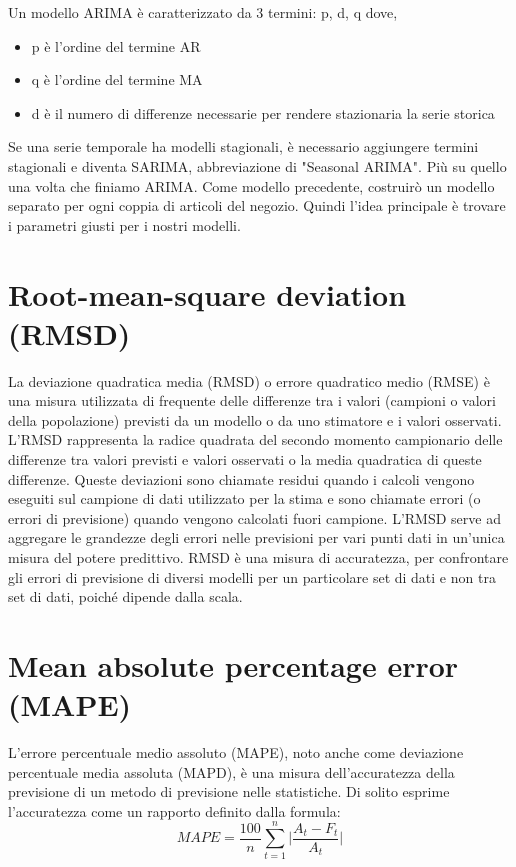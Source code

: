 \documentclass[12pt,a4paper]{report}
\begin{document}
\begin{appendices}
Un modello ARIMA è caratterizzato da 3 termini: p, d, q dove,
\begin{itemize}
    \item p è l'ordine del termine AR
    \item q è l'ordine del termine MA
    \item d è il numero di differenze necessarie per rendere stazionaria la serie storica
\end{itemize}

Se una serie temporale ha modelli stagionali, è necessario aggiungere termini stagionali e diventa SARIMA, abbreviazione di "Seasonal ARIMA". Più su quello una volta che finiamo ARIMA. Come modello precedente, costruirò un modello separato per ogni coppia di articoli del negozio. Quindi l'idea principale è trovare i parametri giusti per i nostri modelli.

\section{Root-mean-square deviation (RMSD)}
\label{appendix:RMSD}
La deviazione quadratica media (RMSD) o errore quadratico medio (RMSE) è una misura utilizzata di frequente delle differenze tra i valori (campioni o valori della popolazione) previsti da un modello o da uno stimatore e i valori osservati. L'RMSD rappresenta la radice quadrata del secondo momento campionario delle differenze tra valori previsti e valori osservati o la media quadratica di queste differenze. Queste deviazioni sono chiamate residui quando i calcoli vengono eseguiti sul campione di dati utilizzato per la stima e sono chiamate errori (o errori di previsione) quando vengono calcolati fuori campione. L'RMSD serve ad aggregare le grandezze degli errori nelle previsioni per vari punti dati in un'unica misura del potere predittivo. RMSD è una misura di accuratezza, per confrontare gli errori di previsione di diversi modelli per un particolare set di dati e non tra set di dati, poiché dipende dalla scala.

\section{Mean absolute percentage error (MAPE)}
\label{appendix:MAPE}
L'errore percentuale medio assoluto (MAPE), noto anche come deviazione percentuale media assoluta (MAPD), è una misura dell'accuratezza della previsione di un metodo di previsione nelle statistiche. Di solito esprime l'accuratezza come un rapporto definito dalla formula:
\begin{equation}
    {\displaystyle MAPE = \frac{100}{n} \sum\limits_{t=1}^{n} \vert \frac{A_t - F_t}{A_t} \vert}
\end{equation}


\end{appendices}
\end{document}
